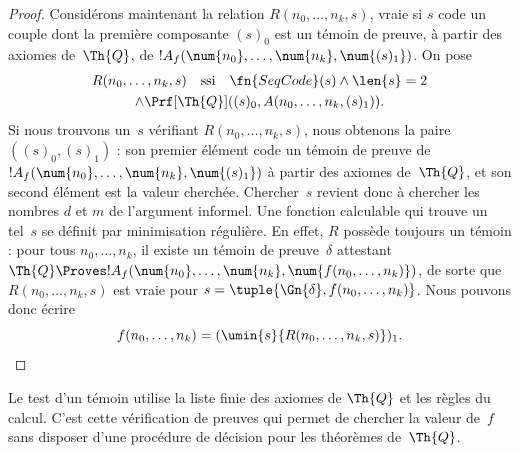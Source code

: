 \documentclass[../../../include/open-logic-section]{subfiles}
\begin{document}
\begin{proof}
Considérons maintenant la relation $R(n_0,\dots,n_k,s)$, vraie si
$s$ code un couple dont la première composante $(s)_0$ est un
témoin de preuve, à partir des axiomes de~$\Th{Q}$, de
$!A_f(\num{n_0},\dots,\num{n_k},\num{(s)_1})$. On pose
\begin{multline*}
R(n_0,\dots,n_k,s) \quad\text{ssi}\quad
\fn{SeqCode}(s)\land \len{s}=2\\
\land \Prf[\Th{Q}]((s)_0,A(n_0,\dots,n_k,(s)_1)).
\end{multline*}
Si nous trouvons un~$s$ vérifiant $R(n_0,\dots,n_k,s)$, nous
obtenons la paire $((s)_0,(s)_1)$ : son premier élément code un
témoin de preuve de
$!A_f(\num{n_0},\dots,\num{n_k},\num{(s)_1})$ à partir
des axiomes de~$\Th{Q}$, et son second élément est la valeur
cherchée. Chercher~$s$ revient donc à chercher les nombres $d$
et $m$ de l'argument informel. Une fonction calculable qui trouve
un tel~$s$ se définit par minimisation régulière. En effet,
$R$ possède toujours un témoin : pour tous $n_0,\dots,n_k$,
il existe un témoin de preuve~$\delta$ attestant
$\Th{Q} \Proves !A_f(\num{n_0},\dots,\num{n_k},
\num{f(n_0,\dots,n_k)})$, de sorte que $R(n_0,\dots,n_k,s)$
est vraie pour
$s=\tuple{\Gn{\delta},f(n_0,\dots,n_k)}$.
Nous pouvons donc écrire
\[
f(n_0,\dots,n_{k}) = (\umin{s}{R(n_0, \dots, n_k, s)})_1.
\]
\end{proof}

\begin{explain}
Le test d'un témoin utilise la liste finie des axiomes de
$\Th{Q}$ et les règles du calcul. C'est cette vérification
de preuves qui permet de chercher la valeur de~$f$ sans disposer
d'une procédure de décision pour les théorèmes de~$\Th{Q}$.
\end{explain}
\end{document}
